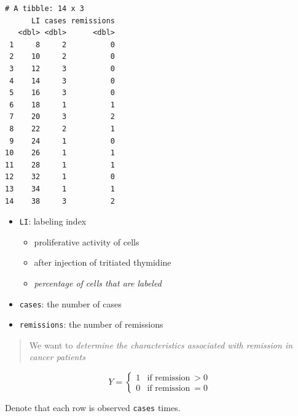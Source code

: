 \documentclass[]{book}
\newenvironment{Shaded}{\begin{snugshade}}{\end{snugshade}}
\newcommand{\DataTypeTok}[1]{\textcolor[rgb]{0.13,0.29,0.53}{#1}}
\newcommand{\KeywordTok}[1]{\textcolor[rgb]{0.13,0.29,0.53}{\textbf{#1}}}
\newcommand{\NormalTok}[1]{#1}
\newcommand{\OperatorTok}[1]{\textcolor[rgb]{0.81,0.36,0.00}{\textbf{#1}}}
\newcommand{\StringTok}[1]{\textcolor[rgb]{0.31,0.60,0.02}{#1}}
\providecommand{\tightlist}{%
  \setlength{\itemsep}{0pt}\setlength{\parskip}{0pt}}
\begin{document}
\begin{verbatim}
# A tibble: 14 x 3
      LI cases remissions
   <dbl> <dbl>      <dbl>
 1     8     2          0
 2    10     2          0
 3    12     3          0
 4    14     3          0
 5    16     3          0
 6    18     1          1
 7    20     3          2
 8    22     2          1
 9    24     1          0
10    26     1          1
11    28     1          1
12    32     1          0
13    34     1          1
14    38     3          2
\end{verbatim}

\begin{Shaded}
\end{Shaded}

\begin{itemize}
\tightlist
\item
  \texttt{LI}: labeling index

  \begin{itemize}
  \tightlist
  \item
    proliferative activity of cells
  \item
    after injection of tritiated thymidine
  \item
    \emph{percentage of cells that are labeled}
  \end{itemize}
\item
  \texttt{cases}: the number of cases
\item
  \texttt{remissions}: the number of remissions
\end{itemize}

\begin{quote}
We want to \emph{determine the characteristics associated with remission in cancer patients}
\end{quote}

\[Y = \begin{cases} 1 & \text{if remission}\: > 0 \\ 0 & \text{if remission}\: = 0 \end{cases}\]

Denote that each row is observed \texttt{cases} times.

\begin{Shaded}
\end{Shaded}
\end{document}
